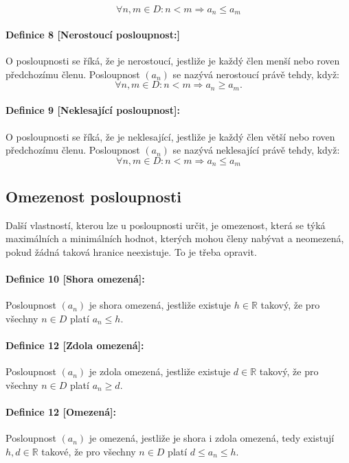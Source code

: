 \documentclass[12pt]{report}			%
\begin{document}
\begin{equation}
\forall n,m \in D:n<m \Rightarrow a_n \leq a_m
\end{equation}
\paragraph{Definice 8 [Nerostoucí posloupnost:]} O posloupnosti se říká, že je nerostoucí, jestliže je každý člen menší nebo roven předchozímu členu. Posloupnost $(a_n)$ se nazývá nerostoucí právě tehdy, když: 
\begin{equation}
\forall n,m \in D: n < m \Rightarrow a_n \geq a_m.
\end{equation}
\paragraph{Definice 9 [Neklesající posloupnost]:} O posloupnosti se říká, že je neklesající, jestliže je každý člen větší nebo roven předchozímu členu. Posloupnost $(a_n)$ se nazývá neklesající právě tehdy, když:
\begin{equation}
\forall n,m \in D: n < m \Rightarrow a_n \leq a_m
\end{equation}
\subsection{Omezenost posloupnosti}
Další vlastností, kterou lze u posloupnosti určit, je omezenost, která se týká maximálních a minimálních hodnot, kterých mohou členy nabývat a neomezená, pokud žádná taková hranice neexistuje. To je třeba opravit.
\paragraph{Definice 10 [Shora omezená]:}
Posloupnost $(a_n)$ je shora omezená, jestliže existuje $h \in \mathbb{R}$ takový, že pro všechny $n \in D$ platí $a_n \leq h$.

\paragraph{Definice 12 [Zdola omezená]:}
Posloupnost $(a_n)$ je zdola omezená, jestliže existuje $d \in \mathbb{R}$ takový, že pro všechny $n \in D$ platí $a_n \geq d$.

\paragraph{Definice 12 [Omezená]:}
Posloupnost $(a_n)$ je omezená, jestliže je shora i zdola omezená, tedy existují $h,d \in \mathbb{R}$ takové, že pro všechny $n \in D$ platí $d \leq a_n \leq h$.
\end{document}
